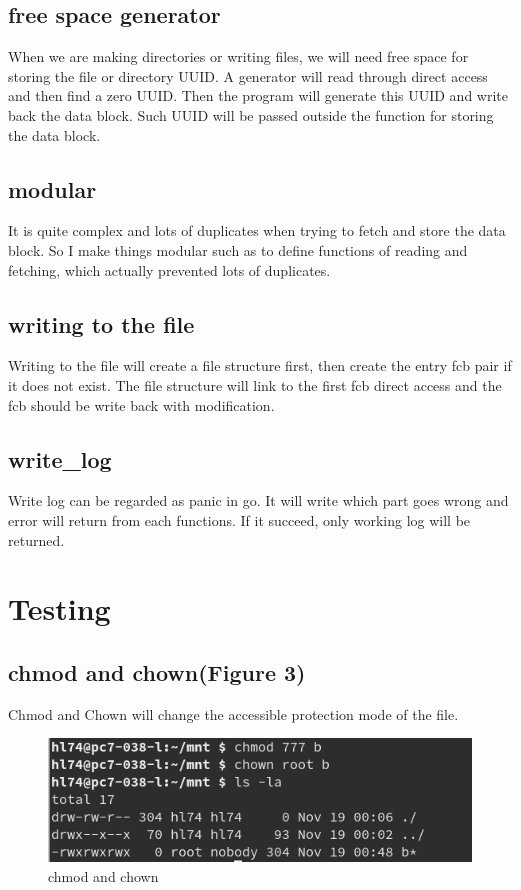 \documentclass[legalpaper]{article}
\begin{document}
	\subsection*{free space generator}
	When we are making directories or writing files, we will need free space for storing the file or directory UUID. A generator will read through direct access and then find a zero UUID. Then the program will generate this UUID and write back the data block. Such UUID will be passed outside the function for storing the data block. 
	\subsection*{modular}
	It is quite complex and lots of duplicates when trying to fetch and store the data block. So I make things modular such as to define functions of reading and fetching, which actually prevented lots of duplicates.
	\subsection*{writing to the file}
	Writing to the file will create a file structure first, then create the entry fcb pair if it does not exist. The file structure will link to the first fcb direct access and the fcb should be write back with modification. 
	\subsection*{write_log}
	Write log can be regarded as panic in go. It will write which part goes wrong and error will return from each functions. If it succeed, only working log will be returned.
	\section{Testing}
	\subsection*{chmod and chown(Figure 3)}
	Chmod and Chown will change the accessible protection mode of the file.
	\begin{figure}[H]
	\centering
	\includegraphics[width = \textwidth]{ch}
	\caption{chmod and chown}
	\end{figure}
\end{document}
